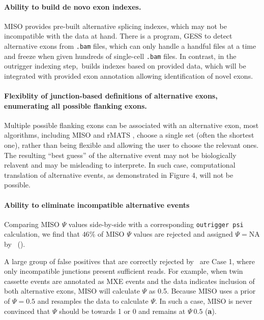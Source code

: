 \paragraph{Ability to build de novo exon indexes.} MISO provides pre-built alternative splicing indexes, which may not be incompatible with the data at hand. There is a program, GESS \cite{Ye:2014cd} to detect alternative exons from \texttt{.bam} files, which can only handle a handful files at a time and freeze when given hundreds of single-cell \texttt{.bam} files. In contrast, in the outrigger indexing step, \outrigger\,builds indexes based on provided data, which will be integrated with provided exon annotation allowing identification of novel exons.

\paragraph{Flexiblity of junction-based definitions of alternative exons, enumerating all possible flanking exons.} Multiple possible flanking exons can be associated with an alternative exon, most algorithms, including MISO and rMATS \cite{Shen2014-zq}, choose a single set (often the shortest one), rather than being flexible and allowing the user to choose the relevant ones. The resulting ``best guess'' of the alternative event may not be biologically relavent and may be misleading to interprete. In such case, computational translation of alternative events, as demonstrated in Figure 4, will not be possible.

\paragraph{Ability to eliminate incompatible alternative events} Comparing MISO $\Psi$ values side-by-side with a corresponding \texttt{outrigger psi} calculation, we find that $46\%$ of MISO $\Psi$ values are rejected and assigned $\Psi = \text{NA}$ by \outrigger\, (\textbf{}).

A large group of false positives that are correctly rejected by \outrigger\, are Case 1, where only incompatible junctions present sufficient reads. For example, when twin cassette events are annotated as MXE events and the data indicates inclusion of both alternative exons, MISO will calculate $\Psi$ as 0.5. Because MISO uses a prior of $\Psi=0.5$ and resamples the data to calculate $\Psi$. In such a case, MISO is never convinced that $\Psi$ should be towards 1 or 0 and remains at $\Psi~0.5$ (\textbf{a}). %

